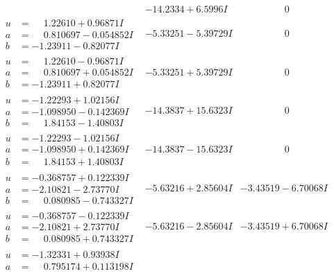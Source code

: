 \documentclass[1p]{elsarticle_modified}
\theoremstyle{definition}
\begin{document}
$$\begin{array}{c|c|c}
 & -14.2334 + 6.5996 I & \phantom{-0.000000 } 0 \\ \hline\begin{aligned}
u &= \phantom{-}1.22610 + 0.96871 I \\
a &= \phantom{-}0.810697 - 0.054852 I \\
b &= -1.23911 - 0.82077 I\end{aligned}
 & -5.33251 - 5.39729 I & \phantom{-0.000000 } 0 \\ \hline\begin{aligned}
u &= \phantom{-}1.22610 - 0.96871 I \\
a &= \phantom{-}0.810697 + 0.054852 I \\
b &= -1.23911 + 0.82077 I\end{aligned}
 & -5.33251 + 5.39729 I & \phantom{-0.000000 } 0 \\ \hline\begin{aligned}
u &= -1.22293 + 1.02156 I \\
a &= -1.098950 - 0.142369 I \\
b &= \phantom{-}1.84153 - 1.40803 I\end{aligned}
 & -14.3837 + 15.6323 I & \phantom{-0.000000 } 0 \\ \hline\begin{aligned}
u &= -1.22293 - 1.02156 I \\
a &= -1.098950 + 0.142369 I \\
b &= \phantom{-}1.84153 + 1.40803 I\end{aligned}
 & -14.3837 - 15.6323 I & \phantom{-0.000000 } 0 \\ \hline\begin{aligned}
u &= -0.368757 + 0.122339 I \\
a &= -2.10821 - 2.73770 I \\
b &= \phantom{-}0.080985 - 0.743327 I\end{aligned}
 & -5.63216 + 2.85604 I & -3.43519 - 6.70068 I \\ \hline\begin{aligned}
u &= -0.368757 - 0.122339 I \\
a &= -2.10821 + 2.73770 I \\
b &= \phantom{-}0.080985 + 0.743327 I\end{aligned}
 & -5.63216 - 2.85604 I & -3.43519 + 6.70068 I \\ \hline\begin{aligned}
u &= -1.32331 + 0.93938 I \\
a &= \phantom{-}0.795174 + 0.113198 I \\

\end{aligned}
\end{array}$$
\end{document}
